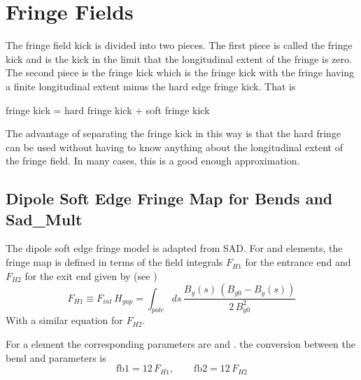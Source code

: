 \chapter{Fringe Fields}
\label{s:fringe.std}

The fringe field kick is divided into two pieces. 
The first piece is called the  fringe kick and is the kick in the limit
that the longitudinal extent of the fringe is zero. The second piece is the 
 fringe kick which is the fringe kick with the fringe having a finite
longitudinal extent minus the hard edge fringe kick. That is
\begin{example}
  fringe kick = hard fringe kick + soft fringe kick
\end{example}
The advantage of separating the fringe kick in this way is that the hard fringe can
be used without having to know anything about the longitudinal extent of the fringe
field. In many cases, this is a good enough approximation. 

\section{Dipole Soft Edge Fringe Map for Bends and Sad_Mult}
\label{s:fringe.bend.soft}

The dipole soft edge fringe model is adapted from SAD\cite{b:sad}. For  and 
elements, the fringe map is defined in terms of the field integrals $F_{H1}$ for the entrance end
and $F_{H2}$ for the exit end given by (see )
\begin{equation}
  F_{H1} \equiv F_{int} \, H_{gap} = \int_{pole} \! \! ds \, \frac{B_y(s) \, (B_{y0} - B_y(s))}
  {2 \, B_{y0}^2}
\end{equation}
With a similar equation for $F_{H2}$.  

For a  element the corresponding parameters are  and . the conversion between
the bend and  parameters is
\begin{equation}
  \text{fb1} = 12 \, F_{H1}, \qquad \text{fb2} = 12 \, F_{H2}
\end{equation}

